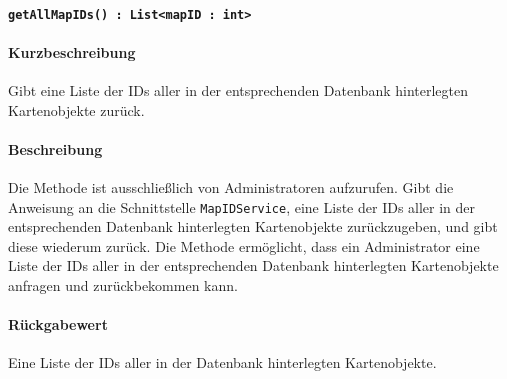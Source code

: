\paragraph{\texttt{getAllMapIDs() : List<mapID : int>}}%
\paragraph*{Kurzbeschreibung}
Gibt eine Liste der IDs aller in der entsprechenden Datenbank hinterlegten Kartenobjekte zurück.
\paragraph*{Beschreibung}
Die Methode ist ausschließlich von Administratoren aufzurufen.
Gibt die Anweisung an die Schnittstelle \texttt{MapIDService}, eine Liste der IDs aller in der entsprechenden Datenbank hinterlegten Kartenobjekte zurückzugeben, und gibt diese wiederum zurück.
Die Methode ermöglicht, dass ein Administrator eine Liste der IDs aller in der entsprechenden Datenbank hinterlegten Kartenobjekte anfragen und zurückbekommen kann.
\paragraph*{Rückgabewert}
Eine Liste der IDs aller in der Datenbank hinterlegten Kartenobjekte.
